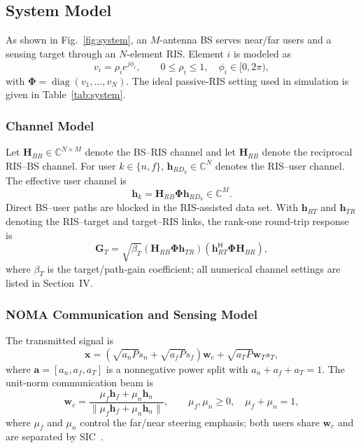 \documentclass[10pt,journal]{IEEEtran}
\newcommand{\bh}{\bm{h}}
\newcommand{\bw}{\bm{w}}
\newcommand{\bG}{\bm{G}}
\newcommand{\bH}{\bm{H}}
\newcommand{\bPhi}{\bm{\Phi}}
\newcommand{\herm}{^{\mathsf{H}}}
\newcommand{\Cset}{\mathbb{C}}
\begin{document}
\subsection{System Model}
As shown in Fig.~\ref{fig:system}, an $M$-antenna BS serves near/far users and
a sensing target through an $N$-element RIS. Element $i$ is modeled as
\begin{equation}
v_i=\rho_i e^{j\phi_i},\qquad 0\leq\rho_i\leq1,\quad \phi_i\in[0,2\pi),
\end{equation}
with $\bPhi=\operatorname{diag}(v_1,\ldots,v_N)$. The ideal passive-RIS
setting used in simulation is given in Table~\ref{tab:system}.

\subsubsection{Channel Model}
Let $\bH_{BR}\in\Cset^{N\times M}$ denote the BS--RIS channel and let
$\bH_{RB}$ denote the reciprocal RIS--BS channel. For user
$k\in\{n,f\}$, $\bh_{RD_k}\in\Cset^N$ denotes the RIS--user channel. The
effective user channel is
\begin{equation}
\bh_k=\bH_{RB}\bPhi\bh_{RD_k}\in\Cset^M. \label{eq:cascade}
\end{equation}
Direct BS--user paths are blocked in the RIS-assisted data set. With
$\bh_{RT}$ and $\bh_{TR}$ denoting the RIS--target and target--RIS links, the
rank-one round-trip response is
\begin{equation}
\bG_T=\sqrt{\beta_T}
(\bH_{RB}\bPhi\bh_{TR})
(\bh_{RT}\herm\bPhi\bH_{BR}), \label{eq:sensingchannel}
\end{equation}
where $\beta_T$ is the target/path-gain coefficient; all numerical channel
settings are listed in Section~IV.

\subsubsection{NOMA Communication and Sensing Model}
The transmitted signal is
\begin{equation}
\bm{x}=\left(\sqrt{a_nP}s_n+\sqrt{a_fP}s_f\right)\bw_c
       +\sqrt{a_TP}\bw_Ts_T, \label{eq:tx}
\end{equation}
where $\bm a=[a_n,a_f,a_T]$ is a nonnegative power split with
$a_n+a_f+a_T=1$. The unit-norm communication beam is
\begin{equation}
\bw_c=
\frac{\mu_f\bh_f+\mu_n\bh_n}
{\|\mu_f\bh_f+\mu_n\bh_n\|},\qquad
\mu_f,\mu_n\ge0,\quad \mu_f+\mu_n=1, \label{eq:wc}
\end{equation}
where $\mu_f$ and $\mu_n$ control the far/near steering emphasis; both users
share $\bw_c$ and are separated by SIC~\cite{ding2017noma,zou2023ml}.
\end{document}
